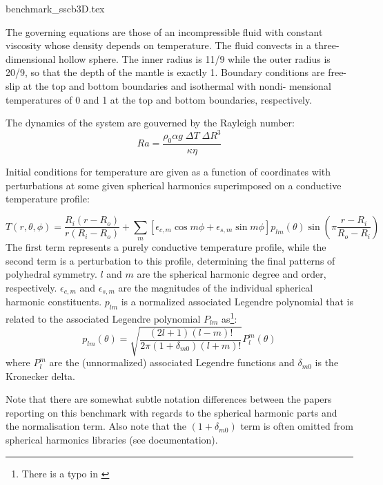 \begin{flushright} {\tiny {\color{gray} benchmark\_sscb3D.tex}} \end{flushright}


The governing equations are those of an incompressible fluid with constant viscosity whose 
density depends on temperature. The fluid convects in a three-dimensional hollow sphere. 
The inner radius is 11/9 while the outer radius is 20/9, so that the depth of the mantle is exactly 1.
Boundary conditions are free-slip at the top
and bottom boundaries and isothermal with nondi-
mensional temperatures of 0 and 1 at the top and
bottom boundaries, respectively.

The dynamics of the system are gouverned by the Rayleigh number:
\[
Ra=\frac{\rho_0 \alpha g \; \Delta T \; \Delta R^3 }{\kappa \eta}
\]

Initial conditions for temperature are given as a function
of coordinates with perturbations at some given
spherical harmonics superimposed on a conductive
temperature profile:

\[
T(r,\theta,\phi)
=\frac{R_i(r-R_o)}{r(R_i-R_o)} 
+
\sum_m
\left[
\epsilon_{c,m} \cos m\phi + \epsilon_{s,m} \sin m\phi
\right]
p_{lm}(\theta) \sin\left( \pi \frac{r-R_i}{R_o-R_i}  \right)
\]
The first term represents a purely conductive temperature profile, while the second term 
is a perturbation to this profile, determining the final patterns of polyhedral symmetry. 
$l$ and $m$ are the spherical harmonic degree and order, respectively.
$\epsilon_{c,m}$ and $\epsilon_{s,m}$ are the magnitudes of the
individual spherical harmonic constituents.
$p_{lm}$ is a normalized associated Legendre
polynomial that is related to the associated
Legendre polynomial $P_{lm}$ as\footnote{There is a typo in \cite{shpe15}}:
\[
p_{lm}(\theta) 
= \sqrt{ \frac{(2l+1)(l-m)!}{2\pi (1+\delta_{m0})(l+m)!}  } P_l^m(\theta) 
\]
where $P_l^m$ are the (unnormalized) associated Legendre functions and  $\delta_{m0}$ 
is the Kronecker delta.

Note that there are somewhat subtle notation differences between the 
papers reporting on this benchmark with regards to the spherical 
harmonic parts and the normalisation term. 
Also note that the $(1+\delta_{m0})$ term is often omitted from 
spherical harmonics libraries (see \aspect documentation). 


